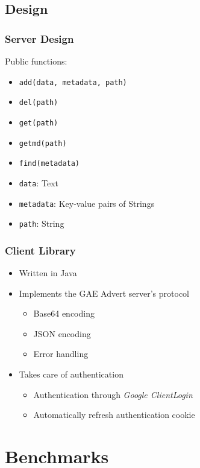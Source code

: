 \documentclass{beamer}
\begin{document}
\subsection{Design}
\frame
{
	\frametitle{Server Design}
	Public functions:
	\begin{itemize}
		\item <1->\texttt{add(data, metadata, path)}
		\item <1->\texttt{del(path)}
		\item <1->\texttt{get(path)}
		\item <1->\texttt{getmd(path)}
		\item <1->\texttt{find(metadata)}
	\end{itemize}
	\begin{itemize}
		\item <2->\texttt{data}: Text
		\item <2->\texttt{metadata}: Key-value pairs of Strings
		\item <2->\texttt{path}: String
	\end{itemize}
}

\frame
{
	\frametitle{Client Library}
	\begin{itemize}
		\item Written in Java
		\item Implements the GAE Advert server's protocol
		\begin{itemize}
			\item Base64 encoding
			\item JSON encoding
			\item Error handling 
		\end{itemize}
		\item Takes care of authentication
		\begin{itemize}
			\item Authentication through \emph{Google ClientLogin}
			\item Automatically refresh authentication cookie
		\end{itemize} 
	\end{itemize}
}

\section{Benchmarks}
\end{document}
